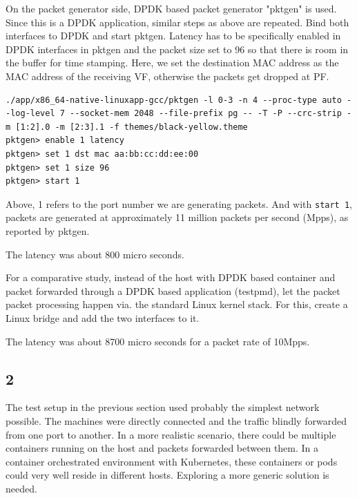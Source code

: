 \documentclass[english, 12pt, a4paper, elec, utf8, a-1b, online]{aaltothesis}
\begin{document}
On the packet generator side, DPDK based packet generator "pktgen" is used. Since this is a DPDK application, similar steps as above are repeated. Bind both interfaces to DPDK and start pktgen.
Latency has to be specifically enabled in DPDK interfaces in pktgen and the packet size set to 96 so that there is room in the buffer for time stamping. Here, we set the destination MAC address as the MAC address of the receiving VF, otherwise the packets get dropped at PF.

\begin{lstlisting}[basicstyle={\small\ttfamily}]
./app/x86_64-native-linuxapp-gcc/pktgen -l 0-3 -n 4 --proc-type auto --log-level 7 --socket-mem 2048 --file-prefix pg -- -T -P --crc-strip -m [1:2].0 -m [2:3].1 -f themes/black-yellow.theme
pktgen> enable 1 latency
pktgen> set 1 dst mac aa:bb:cc:dd:ee:00
pktgen> set 1 size 96
pktgen> start 1
\end{lstlisting}
Above, 1 refers to the port number we are generating packets. And with \lstinline{start 1}, packets are generated at approximately 11 million packets per second (Mpps), as reported by pktgen.

The latency was about 800 micro seconds.

For a comparative study, instead of the host with DPDK based container and packet forwarded through a DPDK based application (testpmd), let the packet packet processing happen via. the standard Linux kernel stack. For this, create a Linux bridge and add the two interfaces to it.

The latency was about 8700 micro seconds for a packet rate of 10Mpps.

\subsection{2}
The test setup in the previous section used probably the simplest network possible. The machines were directly connected and the traffic blindly forwarded from one port to another. In a more realistic scenario, there could be multiple containers running on the host and packets forwarded between them. In a container orchestrated environment with Kubernetes, these containers or pods could very well reside in different hosts. Exploring a more generic solution is needed.
\end{document}
